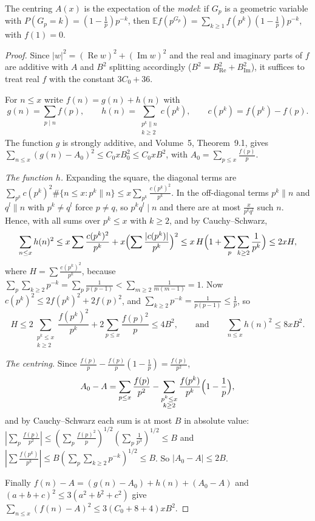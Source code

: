 The centring $A(x)$ is the expectation of the \emph{model}: if $G_p$ is a geometric variable with $P(G_p=k)=(1-\frac1p)p^{-k}$, then $\mathbb E f(p^{G_p})=\sum_{k\ge1}f(p^k)(1-\frac1p)p^{-k}$, with $f(1)=0$.

\begin{proof}
Since $|w|^2=(\operatorname{Re}w)^2+(\operatorname{Im}w)^2$ and the real and imaginary parts of $f$ are additive with $A$ and $B^2$ splitting accordingly ($B^2=B_{\operatorname{Re}}^2+B_{\operatorname{Im}}^2$), it suffices to treat real $f$ with the constant $3C_0+36$.

For $n\le x$ write $f(n)=g(n)+h(n)$ with
\[
g(n)=\sum_{p\mid n}f(p),\qquad h(n)=\sum_{\substack{p^k\parallel n\\k\ge2}}c(p^k),\qquad c(p^k)=f(p^k)-f(p).
\]
The function $g$ is strongly additive, and Volume~5, Theorem~9.1, gives $\sum_{n\le x}(g(n)-A_0)^2\le C_0xB_0^2\le C_0xB^2$, with $A_0=\sum_{p\le x}\frac{f(p)}p$.

\emph{The function $h$.} Expanding the square, the diagonal terms are $\sum_{p^k}c(p^k)^2\#\{n\le x:p^k\parallel n\}\le x\sum_{p^k}\frac{c(p^k)^2}{p^k}$. In the off-diagonal terms $p^k\parallel n$ and $q^l\parallel n$ with $p^k\ne q^l$ force $p\ne q$, so $p^kq^l\mid n$ and there are at most $\frac x{p^kq^l}$ such $n$. Hence, with all sums over $p^k\le x$ with $k\ge2$, and by Cauchy--Schwarz,
\[
\sum_{n\le x}h(n)^2\le x\sum\frac{c(p^k)^2}{p^k}+x\Bigl(\sum\frac{|c(p^k)|}{p^k}\Bigr)^2\le x\,H\Bigl(1+\sum_p\sum_{k\ge2}\frac1{p^k}\Bigr)\le2xH,
\]
where $H=\sum\frac{c(p^k)^2}{p^k}$, because $\sum_p\sum_{k\ge2}p^{-k}=\sum_p\frac1{p(p-1)}<\sum_{m\ge2}\frac1{m(m-1)}=1$. Now $c(p^k)^2\le2f(p^k)^2+2f(p)^2$, and $\sum_{k\ge2}p^{-k}=\frac1{p(p-1)}\le\frac1p$, so
\[
H\le2\sum_{\substack{p^k\le x\\k\ge2}}\frac{f(p^k)^2}{p^k}+2\sum_{p\le x}\frac{f(p)^2}p\le4B^2,\qquad\text{and}\qquad\sum_{n\le x}h(n)^2\le8xB^2.
\]

\emph{The centring.} Since $\frac{f(p)}p-\frac{f(p)}p(1-\frac1p)=\frac{f(p)}{p^2}$,
\[
A_0-A=\sum_{p\le x}\frac{f(p)}{p^2}-\sum_{\substack{p^k\le x\\k\ge2}}\frac{f(p^k)}{p^k}\Bigl(1-\frac1p\Bigr),
\]
and by Cauchy--Schwarz each sum is at most $B$ in absolute value: $|\sum_p\frac{f(p)}{p^2}|\le(\sum_p\frac{f(p)^2}p)^{1/2}(\sum_p\frac1{p^3})^{1/2}\le B$ and $|\sum\frac{f(p^k)}{p^k}|\le B(\sum_p\sum_{k\ge2}p^{-k})^{1/2}\le B$. So $|A_0-A|\le2B$.

Finally $f(n)-A=(g(n)-A_0)+h(n)+(A_0-A)$ and $(a+b+c)^2\le3(a^2+b^2+c^2)$ give $\sum_{n\le x}(f(n)-A)^2\le3(C_0+8+4)xB^2$.
\end{proof}

